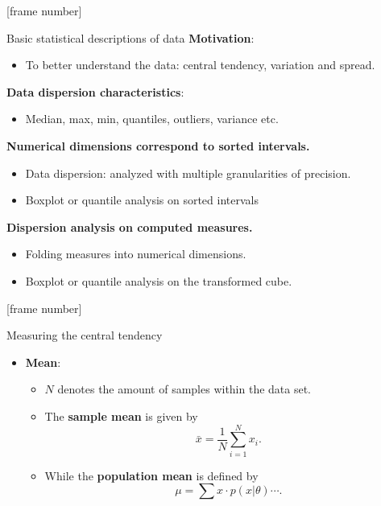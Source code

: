 \documentclass[aspectratio=169,t]{beamer}
\begin{document}
  {
    [frame number]
    \begin{frame}{Basic statistical descriptions of data}
    \textbf{Motivation}:
    \begin{itemize}
      \item To better understand the data: central tendency, variation and spread.
    \end{itemize}

    \textbf{Data dispersion characteristics}:
    \begin{itemize}
        \item Median, max, min, quantiles, outliers, variance etc.
    \end{itemize}

    \textbf{Numerical dimensions correspond to sorted intervals.}\\
    \begin{itemize}
      \item Data dispersion: analyzed with multiple granularities of precision.
      \item Boxplot or quantile analysis on sorted intervals
    \end{itemize}

  \textbf{Dispersion analysis on computed measures.}\\
    \begin{itemize}
        \item Folding measures into numerical dimensions.
        \item Boxplot or quantile analysis on the transformed cube.
    \end{itemize}
    \end{frame}
  }

  {
    [frame number]
    \begin{frame}{Measuring the central tendency}
    \begin{itemize}
      \item \textbf{Mean}:
      \begin{itemize}
          \item $N$ denotes the amount of samples within the data set.
          \item The \textbf{sample mean} is given by\\
                \begin{equation*}
                  \bar{x} = \frac{1}{N} \sum_{i=1}^{N} x_i.
                \end{equation*}
          \item While the \textbf{population mean} is defined by
                \begin{equation*}
                  \mu = \sum x \cdot p(x | \theta) \cdots.
                \end{equation*}
      \end{itemize}
    \end{itemize}
    \end{frame}
  }
\end{document}
